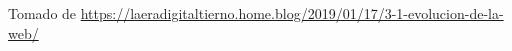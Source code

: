 \documentclass[
10pt, %
aspectratio=169, %
]{beamer}
\begin{document}
\begin{frame}
		{\scriptsize Tomado de \url{https://laeradigitaltierno.home.blog/2019/01/17/3-1-evolucion-de-la-web/}}
		
		
		
	\end{frame}
	
\end{document}
